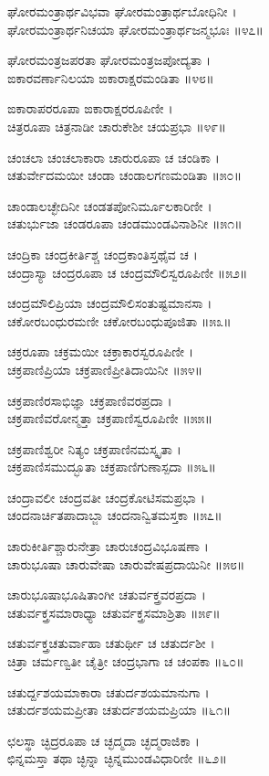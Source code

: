 ಘೋರಮಂತ್ರಾರ್ಥವಿಭವಾ ಘೋರಮಂತ್ರಾರ್ಥಬೋಧಿನೀ ।\\
ಘೋರಮಂತ್ರಾರ್ಥನಿಚಯಾ ಘೋರಮಂತ್ರಾರ್ಥಜನ್ಮಭೂಃ ॥೪೭॥

ಘೋರಮಂತ್ರಜಪರತಾ ಘೋರಮಂತ್ರಜಪೋದ್ಯತಾ ।\\
ಙಕಾರವರ್ಣಾನಿಲಯಾ ಙಕಾರಾಕ್ಷರಮಂಡಿತಾ ॥೪೮॥

ಙಕಾರಾಪರರೂಪಾ ಙಕಾರಾಕ್ಷರರೂಪಿಣೀ ।\\
ಚಿತ್ರರೂಪಾ ಚಿತ್ರನಾಡೀ ಚಾರುಕೇಶೀ ಚಯಪ್ರಭಾ ॥೪೯॥

ಚಂಚಲಾ ಚಂಚಲಾಕಾರಾ ಚಾರುರೂಪಾ ಚ ಚಂಡಿಕಾ ।\\
ಚತುರ್ವೇದಮಯೀ ಚಂಡಾ ಚಂಡಾಲಗಣಮಂಡಿತಾ ॥೫೦॥

ಚಾಂಡಾಲಚ್ಛೇದಿನೀ ಚಂಡತಪೋನಿರ್ಮೂಲಕಾರಿಣೀ ।\\
ಚತುರ್ಭುಜಾ ಚಂಡರೂಪಾ ಚಂಡಮುಂಡವಿನಾಶಿನೀ ॥೫೧॥

ಚಂದ್ರಿಕಾ ಚಂದ್ರಕೀರ್ತಿಶ್ಚ ಚಂದ್ರಕಾಂತಿಸ್ತಥೈವ ಚ ।\\
ಚಂದ್ರಾಸ್ಯಾ ಚಂದ್ರರೂಪಾ ಚ ಚಂದ್ರಮೌಲಿಸ್ವರೂಪಿಣೀ ॥೫೨॥

ಚಂದ್ರಮೌಲಿಪ್ರಿಯಾ ಚಂದ್ರಮೌಲಿಸಂತುಷ್ಟಮಾನಸಾ ।\\
ಚಕೋರಬಂಧುರಮಣೀ ಚಕೋರಬಂಧುಪೂಜಿತಾ ॥೫೩॥

ಚಕ್ರರೂಪಾ ಚಕ್ರಮಯೀ ಚಕ್ರಾಕಾರಸ್ವರೂಪಿಣೀ ।\\
ಚಕ್ರಪಾಣಿಪ್ರಿಯಾ ಚಕ್ರಪಾಣಿಪ್ರೀತಿದಾಯಿನೀ ॥೫೪॥

ಚಕ್ರಪಾಣಿರಸಾಭಿಜ್ಞಾ ಚಕ್ರಪಾಣಿವರಪ್ರದಾ ।\\
ಚಕ್ರಪಾಣಿವರೋನ್ಮತ್ತಾ ಚಕ್ರಪಾಣಿಸ್ವರೂಪಿಣೀ ॥೫೫॥

ಚಕ್ರಪಾಣಿಶ್ವರೀ ನಿತ್ಯಂ ಚಕ್ರಪಾಣಿನಮಸ್ಕೃತಾ ।\\
ಚಕ್ರಪಾಣಿಸಮುದ್ಭೂತಾ ಚಕ್ರಪಾಣಿಗುಣಾಸ್ಪದಾ ॥೫೬॥

ಚಂದ್ರಾವಲೀ ಚಂದ್ರವತೀ ಚಂದ್ರಕೋಟಿಸಮಪ್ರಭಾ ।\\
ಚಂದನಾರ್ಚಿತಪಾದಾಬ್ಜಾ ಚಂದನಾನ್ವಿತಮಸ್ತಕಾ ॥೫೭॥

ಚಾರುಕೀರ್ತಿಶ್ಚಾರುನೇತ್ರಾ ಚಾರುಚಂದ್ರವಿಭೂಷಣಾ ।\\
ಚಾರುಭೂಷಾ ಚಾರುವೇಷಾ ಚಾರುವೇಷಪ್ರದಾಯಿನೀ ॥೫೮॥

ಚಾರುಭೂಷಾಭೂಷಿತಾಂಗೀ ಚತುರ್ವಕ್ತ್ರವರಪ್ರದಾ ।\\
ಚತುರ್ವಕ್ತ್ರಸಮಾರಾಧ್ಯಾ ಚತುರ್ವಕ್ತ್ರಸಮಾಶ್ರಿತಾ ॥೫೯॥

ಚತುರ್ವಕ್ತ್ರಚತುರ್ವಾಹಾ ಚತುರ್ಥೀ ಚ ಚತುರ್ದಶೀ ।\\
ಚಿತ್ರಾ ಚರ್ಮಣ್ವತೀ ಚೈತ್ರೀ ಚಂದ್ರಭಾಗಾ ಚ ಚಂಪಕಾ ॥೬೦॥

ಚತುರ್ದ್ದಶಯಮಾಕಾರಾ ಚತುರ್ದಶಯಮಾನುಗಾ ।\\
ಚತುರ್ದಶಯಮಪ್ರೀತಾ ಚತುರ್ದಶಯಮಪ್ರಿಯಾ ॥೬೧॥

ಛಲಸ್ಥಾ ಚ್ಛಿದ್ರರೂಪಾ ಚ ಚ್ಛದ್ಮದಾ ಚ್ಛದ್ಮರಾಜಿಕಾ ।\\
ಛಿನ್ನಮಸ್ತಾ ತಥಾ ಚ್ಛಿನ್ನಾ ಚ್ಛಿನ್ನಮುಂಡವಿಧಾರಿಣೀ ॥೬೨॥

